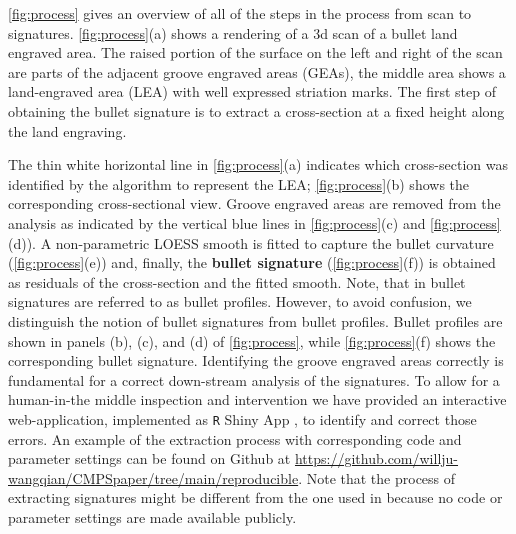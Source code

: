 \autoref{fig:process} gives an overview of all of the steps in the
process from scan to signatures. \autoref{fig:process}(a) shows a
rendering of a 3d scan of a bullet land engraved area. The raised
portion of the surface on the left and right of the scan are parts of
the adjacent groove engraved areas (GEAs), the middle area shows a
land-engraved area (LEA) with well expressed striation marks. The first
step of obtaining the bullet signature is to extract a cross-section at
a fixed height along the land engraving.

The thin white horizontal line in \autoref{fig:process}(a) indicates
which cross-section was identified by the algorithm to represent the
LEA; \autoref{fig:process}(b) shows the corresponding cross-sectional
view. Groove engraved areas are removed from the analysis as indicated
by the vertical blue lines in \autoref{fig:process}(c) and
\autoref{fig:process}(d)). A non-parametric LOESS smooth \citep{loess}
is fitted to capture the bullet curvature (\autoref{fig:process}(e))
and, finally, the \textbf{bullet signature} (\autoref{fig:process}(f))
is obtained as residuals of the cross-section and the fitted smooth.
Note, that in \citet{cmps} bullet signatures are referred to as bullet
profiles. However, to avoid confusion, we distinguish the notion of
bullet signatures from bullet profiles. Bullet profiles are shown in
panels (b), (c), and (d) of \autoref{fig:process}, while
\autoref{fig:process}(f) shows the corresponding bullet signature.
Identifying the groove engraved areas correctly is fundamental for a
correct down-stream analysis of the signatures. To allow for a
human-in-the middle inspection and intervention we have provided an
interactive web-application, implemented as \texttt{R} Shiny App
\citep{shiny},  to identify and correct those
errors. An example of the extraction process with corresponding code and
parameter settings can be found on Github at
\url{https://github.com/willju-wangqian/CMPSpaper/tree/main/reproducible}.
Note that the process of extracting signatures might be different from
the one used in \citet{cmps} because no code or parameter settings are
made available publicly.

